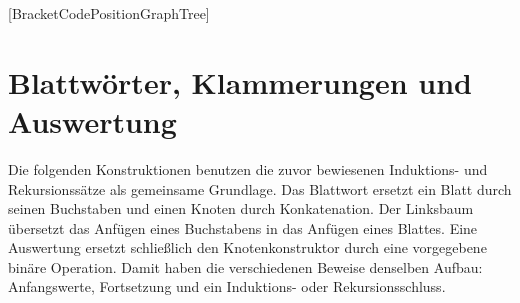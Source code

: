 \documentclass[main.tex]{subfiles}
\begin{document}
\begin{tabproofsplitwide}
  [BracketCodePositionGraphTree]
  \closeproofpartwideindR
\end{tabproofsplitwide}




\chapter{Blattwörter, Klammerungen und Auswertung}

Die folgenden Konstruktionen benutzen die zuvor bewiesenen
Induktions- und Rekursionssätze als gemeinsame Grundlage. Das Blattwort
ersetzt ein Blatt durch seinen Buchstaben und einen Knoten durch
Konkatenation. Der Linksbaum übersetzt das Anfügen eines Buchstabens
in das Anfügen eines Blattes. Eine Auswertung ersetzt schließlich den
Knotenkonstruktor durch eine vorgegebene binäre Operation.
Damit haben die verschiedenen Beweise denselben Aufbau: Anfangswerte,
Fortsetzung und ein Induktions- oder Rekursionsschluss.
\end{document}
